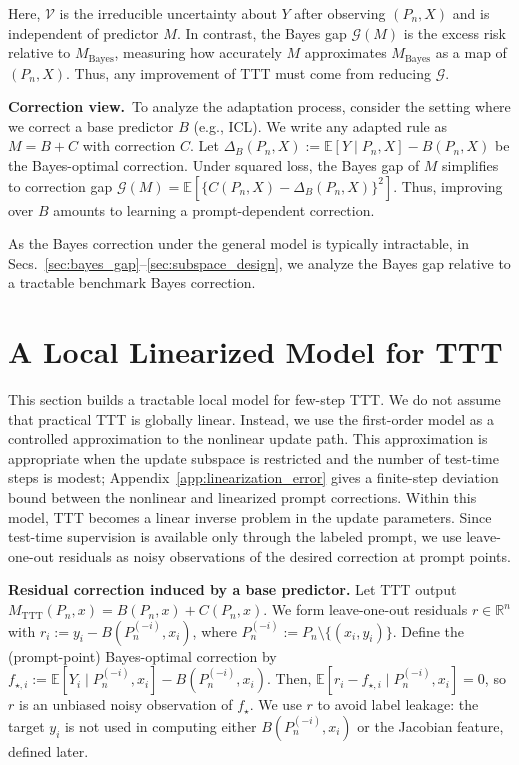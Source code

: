 \documentclass{article}
\newcommand{\E}{\mathbb{E}}
\theoremstyle{plain}
\theoremstyle{definition}
\theoremstyle{remark}
\begin{document}
Here, $\mathcal{V}$ is the irreducible uncertainty about $Y$ after observing $(P_n,X)$ and is independent of predictor $M$. In contrast, the Bayes gap $\mathcal{G}(M)$ is the excess risk relative to $M_{\mathrm{Bayes}}$, measuring how accurately $M$ approximates $M_{\mathrm{Bayes}}$ as a map of $(P_n,X)$. Thus, any improvement of TTT must come from reducing $\mathcal{G}$.

\textbf{Correction view.}\,
To analyze the adaptation process, consider the setting where we correct a base predictor $B$ (e.g., ICL). We write any adapted rule as $M=B+C$ with correction $C$. Let $\Delta_B(P_n,X) := \mathbb E[Y\mid P_n,X]-B(P_n,X)$ be the Bayes-optimal correction. Under squared loss, the Bayes gap of $M$ simplifies to correction gap $\mathcal G(M)=\mathbb E\!\left[\{C(P_n,X)-\Delta_B(P_n,X)\}^2\right]$. Thus, improving over $B$ amounts to learning a prompt-dependent correction. 

As the Bayes correction under the general model is typically intractable, in Secs.~\ref{sec:bayes_gap}--\ref{sec:subspace_design}, we analyze the Bayes gap relative to a tractable benchmark Bayes correction.


\section{A Local Linearized Model for TTT}\label{sec:local_model}

This section builds a tractable local model for few-step TTT. We do not assume that practical TTT is globally linear. Instead, we use the first-order model as a controlled approximation to the nonlinear update path. This approximation is appropriate when the update subspace is restricted and the number of test-time steps is modest; Appendix~\ref{app:linearization_error} gives a finite-step deviation bound between the nonlinear and linearized prompt corrections. Within this model, TTT becomes a linear inverse problem in the update parameters. Since test-time supervision is available only through the labeled prompt, we use leave-one-out residuals as noisy observations of the desired correction at prompt points.

\textbf{Residual correction induced by a base predictor.}
Let TTT output $M_{\mathrm{TTT}}(P_n,x)\!=\!B(P_n,x)+C(P_n,x)$. We form leave-one-out residuals $r\in\mathbb R^n$ with $r_i:=y_i-B(P_n^{(-i)},x_i)$, where $P_n^{(-i)}:=P_n\setminus\{(x_i,y_i)\}$. Define the (prompt-point) Bayes-optimal correction by $f_{\star,i}:=\E[Y_i\mid P_n^{(-i)},x_i]-B(P_n^{(-i)},x_i)$. Then, $\E[ r_i - f_{\star,i}\mid P_n^{(-i)},x_i]=0$, so $r$ is an unbiased noisy observation of $f_\star$. We use $r$ to avoid label leakage: the target $y_i$ is not used in computing either $B(P_n^{(-i)},x_i)$ or the Jacobian feature, defined later.
\end{document}
